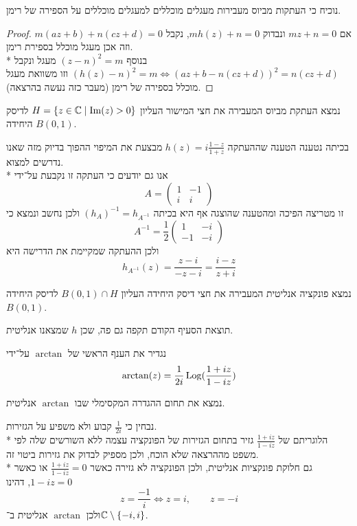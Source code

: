\Subquestion{}
נוכיח כי העתקות מביוס מעבירות מעגלים מוכללים למעגלים מוכללים על הספירה של רימן.
\begin{proof}
	אם $m z + n = 0$ ונבדוק $m h(z) + n = 0$, נקבל $m(az + b) + n(cz + d) = 0$ וזה אכן מעגל מוכלל בספירת רימן. \\*
	בנוסף ${(z - n)}^2 = m$ מעגל ונקבל ${(h(z) - n)}^2 = m \iff {(az + b - n(cz + d))}^2 = n(cz + d)$ וזו משוואת מעגל מוכלל בספירה של רימן (מעבר כזה נעשה בהרצאה).
\end{proof}

\Subquestion{}
נמצא העתקת מביוס המעבירה את חצי המישור העליון $H = \{ z \in \mathbb{C} \mid \operatorname{Im}(z) > 0 \}$ לדיסק היחידה $B(0, 1)$.
\begin{solution}
	בכיתה נטענה הטענה שההעתקה $h(z) = i \frac{1 - z}{1 + z}$ מבצעת את המיפוי ההפוך בדיוק מזה שאנו נדרשים למצוא. \\*
	אנו גם יודעים כי העתקה זו נקבעת על־ידי
	\[
		A = \begin{pmatrix}
			1 & -1 \\
			i & i
		\end{pmatrix}
	\]
	זו מטריצה הפיכה ומהטענה שהוצגה אף היא בכיתה ${(h_A)}^{-1} = h_{A^{-1}}$ ולכן נחשב ונמצא כי
	\[
		A^{-1} = \frac{1}{2} \begin{pmatrix}
			1 & -i \\
			-1 & -i
		\end{pmatrix}
	\]
	ולכן ההעתקה שמקיימת את הדרישה היא
	\[
		h_{A^{-1}}(z)
		= \frac{z - i}{-z - i}
		= \frac{i - z}{z + i}
	\]
\end{solution}

\Subquestion{}
נמצא פונקציה אנליטית המעבירה את חצי דיסק היחידה העליון $B(0, 1) \cap H$ לדיסק היחידה $B(0, 1)$.
\begin{solution}
	תוצאת הסעיף הקודם תקפה גם פה, שכן $h$ שמצאנו אנליטית.
\end{solution}

\Question{}
נגדיר את הענף הראשי של $\arctan$ על־ידי
\[
	\arctan(z) = \frac{1}{2i} \operatorname{Log}(\frac{1 + iz}{1 - iz})
\]

\Subquestion{}
נמצא את תחום ההגדרה המקסימלי שבו $\arctan$ אנליטית.
\begin{solution}
	נבחין כי $\frac{1}{2i}$ קבוע ולא משפיע על הגזירות. \\*
	הלוגריתם של $\frac{1 + iz}{1 - iz}$ גזיר בתחום הגזירות של הפונקציה עצמה ללא השורשים שלה לפי משפט מההרצאה שלא הוכח, ולכן מספיק לבדוק את גזירות ביטוי זה. \\*
	גם חלוקת פונקציות אנליטית, ולכן הפונקציה לא גזירה כאשר $\frac{1 + iz}{1 - iz} = 0$ או כאשר $1 - iz = 0$, דהינו
	\[
		z = \frac{-1}{i} \iff z = i,
		\qquad
		z = -i
	\]
	ולכן $\arctan$ אנליטית ב־$\mathbb{C} \setminus \{-i, i\}$.
\end{solution}

